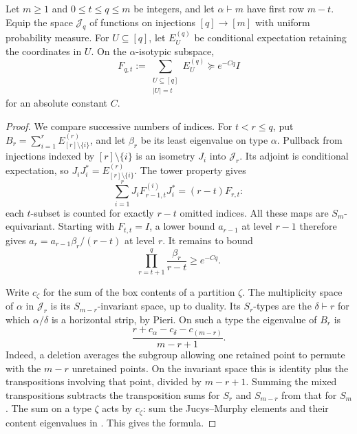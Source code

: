 \begin{lemma}\label{lem:deletion-frame}
Let $m\ge1$ and $0\le t\le q\le m$ be integers, and let $\alpha\vdash m$ have first row $m-t$. Equip the space $\mathcal J_q$ of functions on injections $[q]\to[m]$ with uniform probability measure. For $U\subseteq[q]$, let $E_U^{(q)}$ be conditional expectation retaining the coordinates in $U$. On the $\alpha$-isotypic subspace,
\[
 F_{q,t}:=\sum_{\substack{U\subseteq[q]\\|U|=t}}E_U^{(q)}
 \succeq e^{-Cq}I
\]
for an absolute constant $C$.
\end{lemma}
\begin{proof}
We compare successive numbers of indices. For $t<r\le q$, put
$B_r=\sum_{i=1}^r E_{[r]\setminus\{i\}}^{(r)}$, and let $\beta_r$ be its least eigenvalue on type $\alpha$. Pullback from injections indexed by $[r]\setminus\{i\}$ is an isometry $J_i$ into $\mathcal J_r$. Its adjoint is conditional expectation, so $J_iJ_i^*=E_{[r]\setminus\{i\}}^{(r)}$. The tower property gives
\[
 \sum_{i=1}^r J_iF_{r-1,t}^{(i)}J_i^*=(r-t)F_{r,t}:
\]
each $t$-subset is counted for exactly $r-t$ omitted indices. All these maps are $S_m$-equivariant. Starting with $F_{t,t}=I$, a lower bound $a_{r-1}$ at level $r-1$ therefore gives $a_r=a_{r-1}\beta_r/(r-t)$ at level $r$. It remains to bound
\begin{equation}\label{eq:deletion-product}
 \prod_{r=t+1}^q\frac{\beta_r}{r-t}\ge e^{-Cq}.
\end{equation}

Write $c_\zeta$ for the sum of the box contents of a partition $\zeta$. The multiplicity space of $\alpha$ in $\mathcal J_r$ is its $S_{m-r}$-invariant space, up to duality. Its $S_r$-types are the $\delta\vdash r$ for which $\alpha/\delta$ is a horizontal strip, by Pieri. On such a type the eigenvalue of $B_r$ is
\[
 \frac{r+c_\alpha-c_\delta-c_{(m-r)}}{m-r+1}.
\]
Indeed, a deletion averages the subgroup allowing one retained point to permute with the $m-r$ unretained points. On the invariant space this is identity plus the transpositions involving that point, divided by $m-r+1$. Summing the mixed transpositions subtracts the transposition sums for $S_r$ and $S_{m-r}$ from that for $S_m$. The sum on a type $\zeta$ acts by $c_\zeta$: sum the Jucys--Murphy elements and their content eigenvalues in \citet[Section~2, Eq.~(2.1), and Theorem~5.8]{VershikOkounkov2005}. This gives the formula.


\end{proof}
